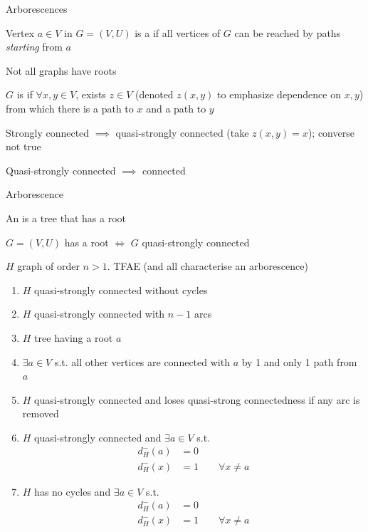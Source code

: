 \documentclass[aspectratio=43]{beamer}
\begin{document}
\begin{frame}{Arborescences}
\begin{definition}[Root]
Vertex $a\in V$ in $G=(V,U)$ is a  if all vertices of $G$ can be reached by paths \emph{starting} from $a$
\end{definition}
Not all graphs have roots
\vfill
\begin{definition}
$G$ is  if $\forall x,y\in V$, exists $z\in V$ (denoted $z(x,y)$ to emphasize dependence on $x,y$) from which there is a path to $x$ and a path to $y$
\end{definition}
Strongly connected $\implies$ quasi-strongly connected (take $z(x,y)=x$); converse not true

Quasi-strongly connected $\implies$ connected
\end{frame}

\begin{frame}{Arborescence}
\begin{definition}[Arborescence]
An  is a tree that has a root
\end{definition}
\vfill
\begin{lemma}
$G=(V,U)$ has a root $\iff$ $G$ quasi-strongly connected
\end{lemma}
\end{frame}

\begin{frame}
\begin{theorem}
$H$ graph of order $n>1$. TFAE (and all characterise an arborescence)
\begin{enumerate}
\item $H$ quasi-strongly connected without cycles
\item $H$ quasi-strongly connected with $n-1$ arcs
\item $H$ tree having a root $a$
\item $\exists a\in V$ s.t. all other vertices are connected with $a$ by 1 and only 1 path from $a$
\item $H$ quasi-strongly connected and loses quasi-strong connectedness if any arc is removed
\item $H$ quasi-strongly connected and $\exists a\in V$ s.t.
\begin{align*}
d_H^-(a)&=0 \\
d_H^-(x)&=1\qquad \forall x\neq a
\end{align*}
\item $H$ has no cycles and $\exists a\in V$ s.t.
\begin{align*}
d_H^-(a)&=0 \\
d_H^-(x)&=1\qquad \forall x\neq a
\end{align*}
\end{enumerate}
\end{theorem}
\end{frame}
\end{document}
